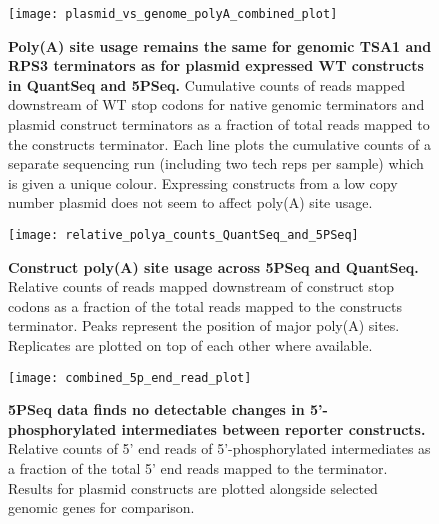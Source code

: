 \documentclass[../main.tex]{subfiles}
\begin{document}
\begin{figure}[ph!]

{\centering \texttt{[image: plasmid\_vs\_genome\_polyA\_combined\_plot]} 

}

\caption[Poly(A) site usage remains the same for genomic TSA1 and RPS3 terminators as for plasmid expressed WT constructs in QuantSeq and 5PSeq.]{\textbf{Poly(A) site usage remains the same for genomic TSA1 and RPS3 terminators as for plasmid expressed WT constructs in QuantSeq and 5PSeq.} Cumulative counts of reads mapped downstream of WT stop codons for native genomic terminators and plasmid construct terminators as a fraction of total reads mapped to the constructs terminator. Each line plots the cumulative counts of a separate sequencing run (including two tech reps per sample) which is given a unique colour. Expressing constructs from a low copy number plasmid does not seem to affect poly(A) site usage.}\label{fig:rnaseq-QC-genomic-vs-plasmid-polyA}
\end{figure}

\begin{figure}[p]

{\centering \texttt{[image: relative\_polya\_counts\_QuantSeq\_and\_5PSeq]} 

}

\caption[Construct poly(A) site usage across 5PSeq and QuantSeq.]{\textbf{Construct poly(A) site usage across 5PSeq and QuantSeq.} Relative counts of reads mapped downstream of construct stop codons as a fraction of the total reads mapped to the constructs terminator. Peaks represent the position of major poly(A) sites. Replicates are plotted on top of each other where available.}\label{fig:relative-polya-counts}
\end{figure}

\begin{figure}[ph!]

{\centering \texttt{[image: combined\_5p\_end\_read\_plot]} 

}

\caption[5PSeq data finds no detectable changes in 5'-phosphorylated intermediates between reporter constructs.]{\textbf{5PSeq data finds no detectable changes in 5'-phosphorylated intermediates between reporter constructs.} Relative counts of 5' end reads of 5'-phosphorylated intermediates as a fraction of the total 5' end reads mapped to the terminator. Results for plasmid constructs are plotted alongside selected genomic genes for comparison.}\label{fig:combined-5p-end-read-plot}
\end{figure}
\end{document}
